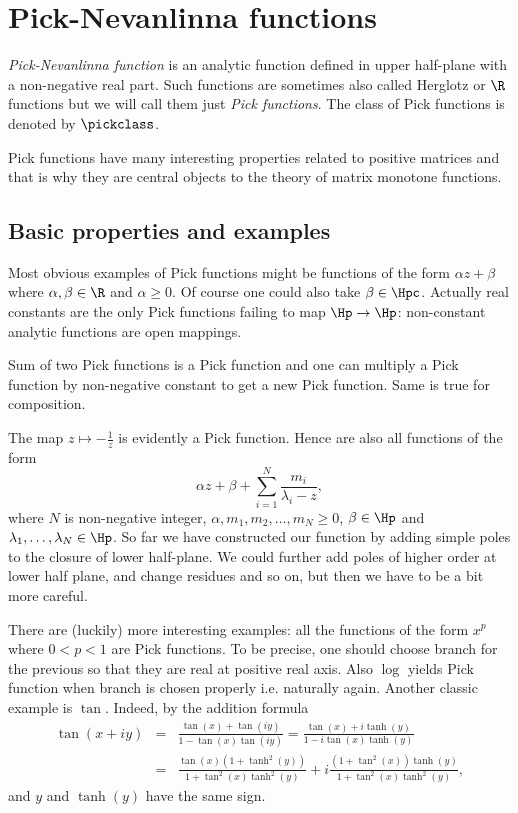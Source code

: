 \chapter{Pick-Nevanlinna functions}

\textit{Pick-Nevanlinna function} is an analytic function defined in upper half-plane with a non-negative real part. Such functions are sometimes also called Herglotz or $\R$ functions but we will call them just \textit{Pick functions}. The class of Pick functions is denoted by $\pickclass$.

Pick functions have many interesting properties related to positive matrices and that is why they are central objects to the theory of matrix monotone functions.

\section{Basic properties and examples}

Most obvious examples of Pick functions might be functions of the form $\alpha z + \beta$ where $\alpha, \beta \in \R$ and $\alpha \geq 0$. Of course one could also take $\beta \in \Hpc$. Actually real constants are the only Pick functions failing to map $\Hp \to \Hp$: non-constant analytic functions are open mappings.

Sum of two Pick functions is a Pick function and one can multiply a Pick function by non-negative constant to get a new Pick function. Same is true for composition.

The map $z \mapsto -\frac{1}{z}$ is evidently a Pick function. Hence are also all functions of the form
\[
	\alpha z + \beta + \sum_{i = 1}^{N} \frac{m_{i}}{\lambda_{i}- z},
\]
where $N$ is non-negative integer, $\alpha, m_{1}, m_{2}, \ldots, m_{N} \geq 0$, $\beta \in \Hp$ and $\lambda_{1}, \ldots, \lambda_{N} \in \Hp$. So far we have constructed our function by adding simple poles to the closure of lower half-plane. We could further add poles of higher order at lower half plane, and change residues and so on, but then we have to be a bit more careful.

There are (luckily) more interesting examples: all the functions of the form $x^{p}$ where $0 < p < 1$ are Pick functions. To be precise, one should choose branch for the previous so that they are real at positive real axis. Also $\log$ yields Pick function when branch is chosen properly i.e. naturally again. Another classic example is $\tan$. Indeed, by the addition formula
\begin{eqnarray*}
	\tan(x + i y) &=& \frac{\tan(x) + \tan(i y)}{1 - \tan(x) \tan(i y)} = \frac{\tan(x) + i \tanh(y)}{1 - i \tan(x) \tanh(y)} \\
	&=& \frac{\tan(x)(1 + \tanh^2(y))}{1 + \tan^2(x) \tanh^2(y)} + i \frac{(1 + \tan^2(x))\tanh(y)}{1 + \tan^2(x) \tanh^2(y)},
\end{eqnarray*}
and $y$ and $\tanh(y)$ have the same sign.

